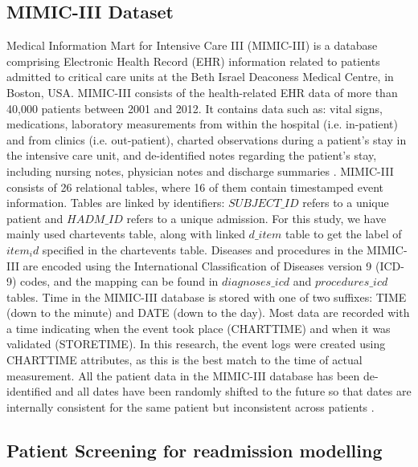 \documentclass[letterpaper, 10pt, conference]{ieeeconf} %
\begin{document}
\subsection{MIMIC-III Dataset}
Medical Information Mart for Intensive Care III (MIMIC-III) is a database comprising Electronic Health Record (EHR) information related to patients admitted to critical care units at the Beth Israel Deaconess Medical Centre, in Boston, USA. MIMIC-III consists of the health-related EHR data of more than 40,000 patients between 2001 and 2012. It contains data such as: vital signs, medications, laboratory measurements from within the hospital (i.e. in-patient) and from clinics (i.e. out-patient), charted observations during a patient’s stay in the intensive care unit, and de-identified notes regarding the patient’s stay, including nursing notes, physician notes and discharge summaries \cite{johnson2016mimic}. MIMIC-III consists of 26 relational tables, where 16 of them contain timestamped event information. Tables are linked by identifiers: $SUBJECT\_ID$ refers to a unique patient and $HADM\_ID$ refers to a unique admission. For this study, we have mainly used chartevents table, along with linked $d\_item$ table to get the label of $item_id$ specified in the chartevents table. Diseases and procedures in the MIMIC-III are encoded using the International Classification of Diseases version 9 (ICD-9) codes, and the mapping can be found in $diagnoses\_icd$ and $procedures\_icd$ tables. Time in the MIMIC-III database is stored with one of two suffixes: TIME (down to the minute) and DATE (down to the day). Most data are recorded with a time indicating when the event took place (CHARTTIME) and when it was validated (STORETIME). In this research, the event logs were created using CHARTTIME attributes, as this is the best match to the time of actual measurement. All the patient data in the MIMIC-III database has been de-identified and all dates have been randomly shifted to the future so that dates are internally consistent for the same patient but inconsistent across patients \cite{Desautelse017199}.

\subsection{ Patient Screening for readmission modelling}
\end{document}
